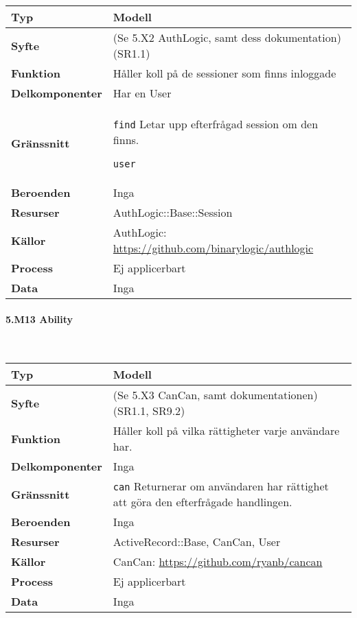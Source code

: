 \documentclass[a4paper, twoside, 11pt, titlepage]{article}
\begin{document}
			\begin {table} [ht] \begin{tabular} {  p{3.5cm} p{11.6cm} }
				\hline
				{\sffamily\textbf{Typ}} & {Modell} \\
				\hline
				{\sffamily\textbf{Syfte}} & {(Se 5.X2 AuthLogic, samt dess dokumentation) (SR1.1)} \\
				\hline
				{\sffamily\textbf{Funktion}} & {Håller koll på de sessioner som finns inloggade} \\
				\hline
				{\sffamily\textbf{Delkomponenter}} & {Har en User} \\
				\hline
				{\sffamily\textbf{Gränssnitt}} & {{\tt find} Letar upp efterfrågad session om den finns.

{\tt user} } \\
				\hline
				{\sffamily\textbf{Beroenden}} & {Inga} \\
				\hline
				{\sffamily\textbf{Resurser}} & {AuthLogic::Base::Session} \\
				\hline
				{\sffamily\textbf{Källor}} & {AuthLogic: \url{https://github.com/binarylogic/authlogic}} \\
				\hline
				{\sffamily\textbf{Process}} & {Ej applicerbart} \\
				\hline
				{\sffamily\textbf{Data}} & {Inga} \\
				\hline
			\end{tabular} \end{table} \FloatBarrier


			\paragraph{5.M13 Ability}\

			\begin {table} [ht] \begin{tabular} {  p{3.5cm} p{11.6cm} }
				\hline
				{\sffamily\textbf{Typ}} & {Modell} \\
				\hline
				{\sffamily\textbf{Syfte}} & {(Se 5.X3 CanCan, samt dokumentationen) (SR1.1, SR9.2)} \\
				\hline
				{\sffamily\textbf{Funktion}} & {Håller koll på vilka rättigheter varje användare har.} \\
				\hline
				{\sffamily\textbf{Delkomponenter}} & {Inga} \\
				\hline
				{\sffamily\textbf{Gränssnitt}} & {{\tt can} Returnerar om användaren har rättighet att göra den efterfrågade handlingen.} \\
				\hline
				{\sffamily\textbf{Beroenden}} & {Inga} \\
				\hline
				{\sffamily\textbf{Resurser}} & {ActiveRecord::Base, CanCan, User} \\
				\hline
				{\sffamily\textbf{Källor}} & {CanCan: \url{https://github.com/ryanb/cancan}} \\
				\hline
				{\sffamily\textbf{Process}} & {Ej applicerbart} \\
				\hline
				{\sffamily\textbf{Data}} & {Inga} \\
				\hline
			\end{tabular} \end{table} \FloatBarrier
\end{document}
